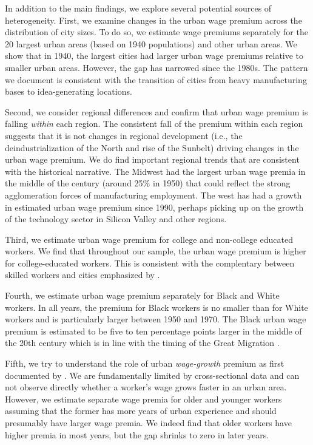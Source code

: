 \documentclass[12pt]{article}
\begin{document}
In addition to the main findings, we explore several potential sources of heterogeneity.
First, we examine changes in the urban wage premium across the distribution of city sizes.
To do so, we estimate wage premiums separately for the 20 largest urban areas (based on 1940 populations) and other urban areas.
We show that in 1940, the largest cities had larger urban wage premiums relative to smaller urban areas.
However, the gap has narrowed since the 1980s.
The pattern we document is consistent with the transition of cities from heavy manufacturing bases to idea-generating locations.

Second, we consider regional differences and confirm that urban wage premium is falling \textit{within} each region.
The consistent fall of the premium within each region suggests that it is not changes in regional development (i.e., the deindustrialization of the North and rise of the Sunbelt) driving changes in the urban wage premium.
We do find important regional trends that are consistent with the historical narrative.
The Midwest had the largest urban wage premia in the middle of the century (around 25\% in 1950) that could reflect the strong agglomeration forces of manufacturing employment. 
The west has had a growth in estimated urban wage premium since 1990, perhaps picking up on the growth of the technology sector in Silicon Valley and other regions. 

Third, we estimate urban wage premium for college and non-college educated workers. 
We find that throughout our sample, the urban wage premium is higher for college-educated workers.
This is consistent with the complentary between skilled workers and cities emphasized by \citet{moretti2013real}.

Fourth, we estimate urban wage premium separately for Black and White workers. 
In all years, the premium for Black workers is no smaller than for White workers and is particularly larger between 1950 and 1970.
The Black urban wage premium is estimated to be five to ten percentage points larger in the middle of the 20th century which is in line with the timing of the Great Migration \citep{derenoncourt2022can}.

Fifth, we try to understand the role of urban \emph{wage-growth} premium as first documented by \citet{BaumSnow_Pavan_2012}. 
We are fundamentally limited by cross-sectional data and can not observe directly whether a worker's wage grows faster in an urban area. 
However, we estimate separate wage premia for older and younger workers assuming that the former has more years of urban experience and should presumably have larger wage premia.
We indeed find that older workers have higher premia in most years, but the gap shrinks to zero in later years. 
\end{document}
